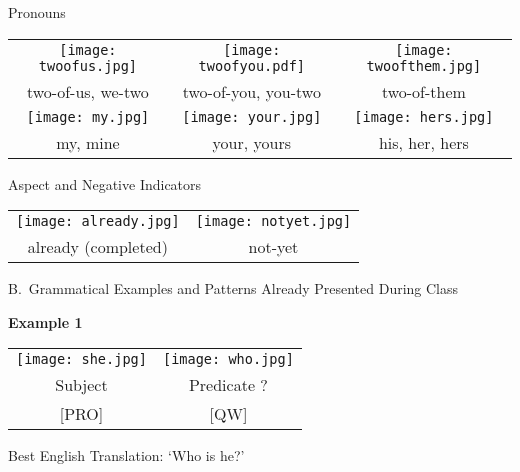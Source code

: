 \documentclass{tufte-book}
\begin{document}
\newpage

\noindent Pronouns

\begin{table*}[h!]
\begin{tabular}{c c c}
\texttt{[image: twoofus.jpg]}&\texttt{[image: twoofyou.pdf]}&\texttt{[image: twoofthem.jpg]}\\
\footnotesize two-of-us, we-two & \footnotesize two-of-you, you-two & \footnotesize two-of-them\\
\texttt{[image: my.jpg]}&\texttt{[image: your.jpg]}&\texttt{[image: hers.jpg]}\\
\footnotesize my, mine & \footnotesize your, yours & \footnotesize his, her, hers\\

\end{tabular}
\end{table*}

\vspace{0.25cm}\noindent Aspect and Negative Indicators

\begin{table*}[h!]
\begin{tabular}{c c}
\texttt{[image: already.jpg]}&\texttt{[image: notyet.jpg]}\\
\footnotesize already (completed) & \footnotesize not-yet \\
\end{tabular}
\end{table*}
\newpage

\noindent B.~Grammatical Examples and Patterns Already Presented During Class

\vspace{0.25cm}\noindent \textbf{Example 1}
\begin{table*}[h!]
\begin{tabular}{c | c }
\texttt{[image: she.jpg]}&\texttt{[image: who.jpg]}\\
\footnotesize Subject & \footnotesize Predicate ?\\
\footnotesize [PRO] & \footnotesize [QW]\\
\end{tabular}
\end{table*}

Best English Translation: `Who is he?'
\end{document}
